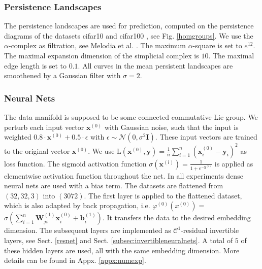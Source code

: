 \documentclass[envcountsect,runningheads]{llncs}
\begin{document}
\subsubsection*{Persistence Landscapes} The persistence landscapes are used for prediction, computed on the persistence diagrams of the datasets cifar10 and cifar100 , see Fig. \ref{homgroups}. We use the $\alpha$-complex as filtration, see Melodia et al. . The maximum $\alpha$-square is set to $e^{12}$. The maximal expansion dimension of the simplicial complex is $10$. The maximal edge length is set to $0.1$. All curves in the mean persistent landscapes are smoothened by a Gaussian filter with $\sigma = 2$.


\subsubsection*{Neural Nets} The data manifold is supposed to be some connected commutative Lie group. We perturb each input vector $\textbf{x}^{(0)}$ with Gaussian noise, such that the input is weighted $0.8 \cdot \textbf{x}^{(0)} + 0.5 \cdot \epsilon$ with $\epsilon \sim \mathcal{N}(0,\sigma^2 \mathbf{I})$. These input vectors are trained to the original vector $\textbf{x}^{(0)}$. We use $\text{L}(\textbf{x}^{(0)}, \textbf{y}) = \frac{1}{n} \sum_{i=1}^{n} \left(\textbf{x}^{(0)}_i-\textbf{y}_i\right)^2$ as loss function. The sigmoid activation function $\sigma(\mathbf{x}^{(l)}) = \frac{1}{1 + e^{-\mathbf{x}^{(l)}}}$ is applied as elementwise activation function throughout the net. In all experiments dense neural nets are used with a bias term. The datasets are flattened from $(32,32,3)$ into $(3072)$. The first layer is applied to the flattened dataset, which is also adapted by back propagation, i.e. $\varphi^{(0)}\left(x^{(0)} \right) =$ $\sigma\left( \sum_{i=1}^{n} \textbf{W}_{ji}^{(1)} \textbf{x}_{i}^{(0)} + \textbf{b}_{i}^{(1)} \right)$. It transfers the data to the desired embedding dimension. The subsequent layers are implemented as $\mathcal{C}^1$-residual invertible layers, see Sect. \ref{resnet} and Sect. \ref{subsec:invertibleneuralnets}. A total of $5$ of these hidden layers are used, all with the same embedding dimension. More details can be found in Appx. \ref{appx:numexp}.
\end{document}
